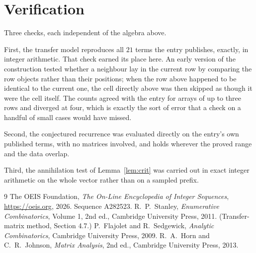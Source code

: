 \documentclass[11pt,a4paper]{article}
\theoremstyle{plain}
\theoremstyle{definition}
\begin{document}
\section{Verification}

Three checks, each independent of the algebra above.

First, the transfer model reproduces all $21$ terms the entry publishes, exactly, in
integer arithmetic. That check earned its place here. An early version of the construction
tested whether a neighbour lay in the current row by comparing the row objects rather
than their positions; when the row above happened to be identical to the current one, the
cell directly above was then skipped as though it were the cell itself. The counts agreed with
the entry for arrays of up to three rows and diverged at four, which is exactly the sort of
error that a check on a handful of small cases would have missed.

Second, the conjectured recurrence was evaluated directly on the entry's own published terms,
with no matrices involved, and holds wherever the proved range and the data overlap.

Third, the annihilation test of Lemma~\ref{lem:crit} was carried out in exact integer
arithmetic on the whole vector rather than on a sampled prefix.

\begin{thebibliography}{9}
 The OEIS Foundation, \emph{The On-Line Encyclopedia of Integer
Sequences}, \url{https://oeis.org}, 2026. Sequence A282523.
 R.~P.~Stanley, \emph{Enumerative Combinatorics}, Volume 1, 2nd ed.,
Cambridge University Press, 2011. (Transfer-matrix method, Section 4.7.)
 P.~Flajolet and R.~Sedgewick, \emph{Analytic Combinatorics}, Cambridge
University Press, 2009.
 R.~A.~Horn and C.~R.~Johnson, \emph{Matrix Analysis}, 2nd ed., Cambridge
University Press, 2013.
\end{thebibliography}
\end{document}
